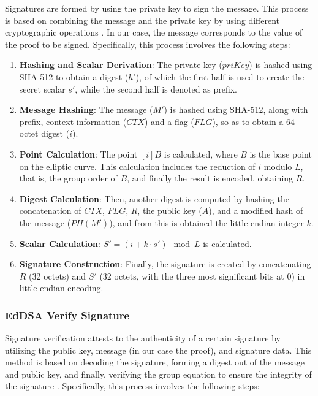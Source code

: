 Signatures are formed by using the private key to sign the message. This process is based on combining the message and the private key by using different cryptographic 
operations \cite{10054286}. In our case, the message corresponds to the value of the proof to be signed. Specifically, this process involves the following steps:

\begin{enumerate}
  \item \textbf{Hashing and Scalar Derivation}: The private key ($priKey$) is hashed using SHA-512 to obtain a digest ($h'$), of which the first half is used to create the 
  secret scalar $s'$, while the second half is denoted as prefix.
  \item \textbf{Message Hashing}: The message ($M'$) is hashed using SHA-512, along with prefix, context information ($CTX$) and a flag ($FLG$), so as to obtain a 64-octet 
  digest ($i$).
  \item \textbf{Point Calculation}: The point $[i]B$ is calculated, where $B$ is the base point on the elliptic curve. This calculation includes the reduction of 
  $i$ modulo $L$, that is, the group order of $B$, and finally the result is encoded, obtaining $R$.
  \item \textbf{Digest Calculation}: Then, another digest is computed by hashing the concatenation of $CTX$, $FLG$, $R$, the public key ($A$), and a modified hash of the message 
  ($PH(M')$), and from this is obtained the little-endian integer $k$.
  \item \textbf{Scalar Calculation}: $S' = (i + k \cdot s') \mod L$ is calculated.
  \item \textbf{Signature Construction}: Finally, the signature is created by concatenating $R$ (32 octets) and $S'$ (32 octets, with the three most significant bits at $0$) 
  in little-endian encoding.
\end{enumerate}

\subsubsection{EdDSA Verify Signature}

Signature verification attests to the authenticity of a certain signature by utilizing the public key, message (in our case the proof), and signature data. This method is 
based on decoding the signature, forming a digest out of the message and public key, and finally, verifying the group equation to ensure the integrity of the signature \cite{10054286}. 
Specifically, this process involves the following steps:

